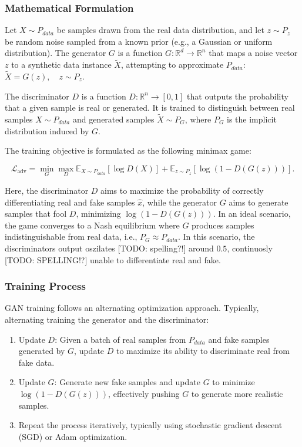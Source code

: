 \subsubsection{Mathematical Formulation}\label{theoretical_gan_math}
Let \(X \sim P_{data}\) be samples drawn from the real data distribution, and let \(z \sim P_z\) be random noise sampled from a known prior (e.g., a Gaussian or uniform distribution). The generator \(G\) is a function \(G: \mathbb{R}^d \to \mathbb{R}^n\) that maps a noise vector \(z\) to a synthetic data instance \(\tilde{X}\), attempting to approximate \(P_{data}\):\(\tilde{X} = G(z), \quad z \sim P_z.\)

The discriminator \(D\) is a function \(D: \mathbb{R}^n \to [0,1]\) that outputs the probability that a given sample is real or generated. It is trained to distinguish between real samples \(X \sim P_{data}\) and generated samples \(\tilde{X} \sim P_G\), where \(P_G\) is the implicit distribution induced by \(G\).

The training objective is formulated as the following minimax game:

    \begin{equation}\label{theory_gan_vanilla_formula}
        \mathcal{L}_{\text{adv}} = \min_G \max_D \mathbb{E}_{X \sim P_{data}} [\log D(X)] + \mathbb{E}_{z \sim P_z} [\log (1 - D(G(z)))].
    \end{equation}

Here, the discriminator \(D\) aims to maximize the probability of correctly differentiating real and fake samples \(\hat{x}\), while the generator \(G\) aims to generate samples that fool \(D\), minimizing \(\log(1 - D(G(z)))\). In an ideal scenario, the game converges to a Nash equilibrium where \(G\) produces samples indistinguishable from real data, i.e., \(P_G \approx P_{data}\). In this scenario, the discriminators output oszilates [TODO: spelling?!] around $0.5$, continuosly [TODO: SPELLING!?] unable to differentiate real and fake.

\subsubsection{Training Process}\label{theoretical_gan_training}
GAN training follows an alternating optimization approach. Typically, alternating training the generator and the discriminator:
\begin{enumerate}
    \item Update \(D\): Given a batch of real samples from \(P_{data}\) and fake samples generated by \(G\), update \(D\) to maximize its ability to discriminate real from fake data.
    \item Update \(G\): Generate new fake samples and update \(G\) to minimize \\ \(\log(1 - D(G(z)))\), effectively pushing \(G\) to generate more realistic samples.
    \item Repeat the process iteratively, typically using stochastic gradient descent (SGD) or Adam optimization.
\end{enumerate}

